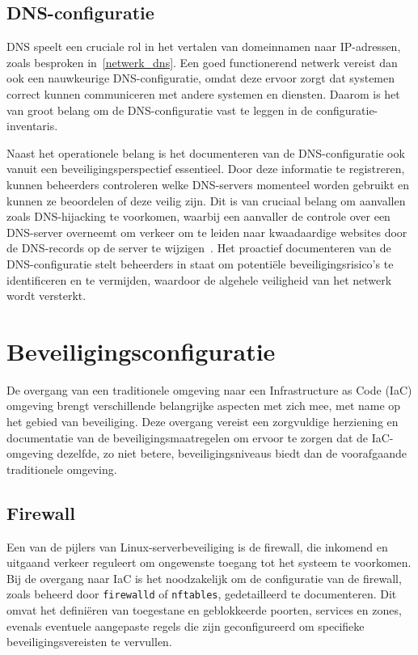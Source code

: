 \subsection{DNS-configuratie}
\label{risico_dns}

DNS speelt een cruciale rol in het vertalen van domeinnamen naar IP-adressen, zoals besproken in~\ref{netwerk_dns}.
Een goed functionerend netwerk vereist dan ook een nauwkeurige DNS-configuratie, omdat deze ervoor zorgt dat systemen correct kunnen communiceren met andere systemen en diensten.
Daarom is het van groot belang om de DNS-configuratie vast te leggen in de configuratie-inventaris.

Naast het operationele belang is het documenteren van de DNS-configuratie ook vanuit een beveiligingsperspectief essentieel.
Door deze informatie te registreren, kunnen beheerders controleren welke DNS-servers momenteel worden gebruikt en kunnen ze beoordelen of deze veilig zijn.
Dit is van cruciaal belang om aanvallen zoals DNS-hijacking te voorkomen, waarbij een aanvaller de controle over een DNS-server overneemt om verkeer om te leiden naar kwaadaardige websites door de DNS-records op de server te wijzigen~\autocite{shaikh2020overcoming}.
Het proactief documenteren van de DNS-configuratie stelt beheerders in staat om potenti\"ele beveiligingsrisico's te identificeren en te vermijden, waardoor de algehele veiligheid van het netwerk wordt versterkt.

\section{Beveiligingsconfiguratie}
\label{risico_beveiligingsconfiguratie}

De overgang van een traditionele omgeving naar een Infrastructure as Code (IaC) omgeving brengt verschillende belangrijke aspecten met zich mee, met name op het gebied van beveiliging.
Deze overgang vereist een zorgvuldige herziening en documentatie van de beveiligingsmaatregelen om ervoor te zorgen dat de IaC-omgeving dezelfde, zo niet betere, beveiligingsniveaus biedt dan de voorafgaande traditionele omgeving.

\subsection{Firewall}
\label{risico_firewall}

Een van de pijlers van Linux-serverbeveiliging is de firewall, die inkomend en uitgaand verkeer reguleert om ongewenste toegang tot het systeem te voorkomen.
Bij de overgang naar IaC is het noodzakelijk om de configuratie van de firewall, zoals beheerd door \texttt{firewalld} of \texttt{nftables}, gedetailleerd te documenteren.
Dit omvat het defini\"eren van toegestane en geblokkeerde poorten, services en zones, evenals eventuele aangepaste regels die zijn geconfigureerd om specifieke beveiligingsvereisten te vervullen.

